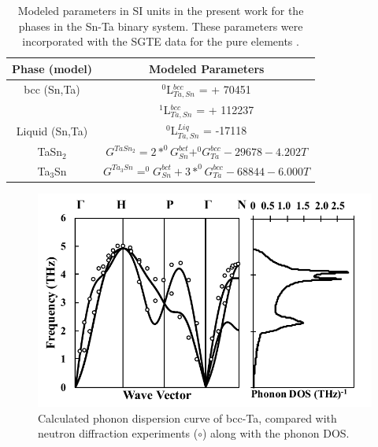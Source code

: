 \newpage
\begin{table}[H]
 	\caption{Modeled parameters in SI units in the present work for the phases in the Sn-Ta binary system. These parameters were incorporated with the SGTE data for the pure elements \cite{Dinsdale1991}.}
 	\centering
 	\begin{tabular}{ c c }
 		\hline
 		Phase (model) & Modeled Parameters\\
 		\hline
 		bcc (Sn,Ta) & $^0$L$_{Ta,Sn}^{bcc}$ = + 70451\\
 		 & $^1$L$_{Ta,Sn}^{bcc}$ = + 112237\\
 		 Liquid (Sn,Ta) & $^0$L$_{Ta,Sn}^{Liq}$ = -17118\\
 		 TaSn$_2$ & $G^{TaSn_{2}} = 2*^0G_{Sn}^{bct} + ^{0}G_{Ta}^{bcc} -29678 - 4.202T$ \\
 		 Ta$_3$Sn & $G^{Ta_{3}Sn} = ^0G_{Sn}^{bct} + 3*^{0}G_{Ta}^{bcc} -68844 - 6.000T$ \\
 		\hline
 	\end{tabular}
 	\label{Ch4-table:ip}
 \end{table}
 \clearpage

\pagebreak
\begin{figure}[H]
	\centering
	\includegraphics[width=\textwidth]{Chapter-4/Figures/Taphonondos.pdf}
	\caption{Calculated phonon dispersion curve of bcc-Ta, compared with neutron diffraction experiments ($\circ$) \cite{Taioli2007a} along with the phonon DOS.}
	\label{Ch4-figure:Taphonon}
\end{figure}

